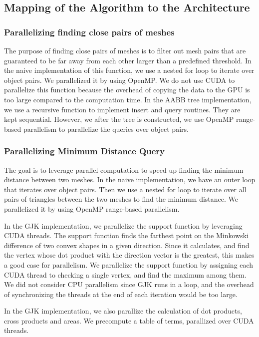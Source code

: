 \documentclass[12pt,fleqn]{article}
\begin{document}
\subsection{Mapping of the Algorithm to the Architecture}
\subsubsection{Parallelizing finding close pairs of meshes}
The purpose of finding close pairs of meshes is to filter out mesh pairs that are guaranteed to be far away from each other larger than a predefined threshold.
In the naive implementation of this function, we use a nested for loop to iterate over object pairs.
We parallelized it by using OpenMP.
We do not use CUDA to parallelize this function because the overhead of copying the data to the GPU is too large compared to the computation time.
In the AABB tree implementation, we use a recursive function to implement insert and query routines. They are kept sequential. However, we after the tree is constructed, we use OpenMP range-based parallelism to parallelize the queries over object pairs.

\subsubsection{Parallelizing Minimum Distance Query}
The goal is to leverage parallel computation to speed up finding the minimum distance between two meshes.
In the naive implementation, we have an outer loop that iterates over object pairs. Then we use a nested for loop to iterate over all pairs of triangles between the two meshes to find the minimum distance. We parallelized it by using OpenMP range-based parallelism.

In the GJK implementation, we parallelize the support function by leveraging CUDA threads. The support function finds the farthest point on the Minkowski difference of two convex shapes in a given direction. Since it calculates, and find the vertex whose dot product with the direction vector is the greatest, this makes a good case for parallelism. We parallelize the support function by assigning each CUDA thread to checking a single vertex, and find the maximum among them. We did not consider CPU parallelism since GJK runs in a loop, and the overhead of synchronizing the threads at the end of each iteration would be too large.

In the GJK implementation, we also parallize the calculation of dot products, cross products and areas. We precompute a table of terms, parallized over CUDA threads.
\end{document}
